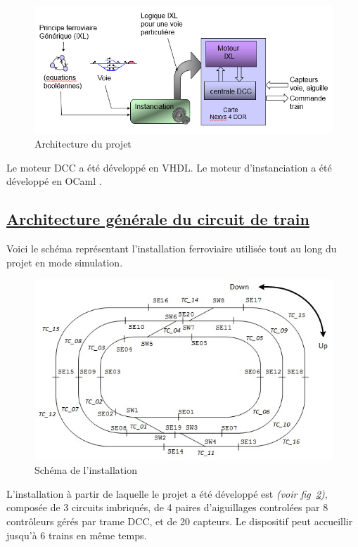 \begin{figure}[ht]
\centering
\includegraphics[scale=0.45]{moteur.png}
\caption{Architecture du projet}
\label{archi}
\end{figure}

Le moteur DCC a été développé en VHDL. Le moteur d'instanciation a été
développé en OCaml \cite{OCAML}.


\newpage
\subsection{\underline{Architecture g\'en\'erale du circuit de train}}
\label{sec:archi}

Voici le sch\'ema repr\'esentant l'installation ferroviaire utilis\'ee
tout au long du projet en mode simulation.

\begin{figure}[h]
\centering
\includegraphics[scale=0.55]{circuit_complet.jpg}
\caption{Sch\'ema de l'installation}
\label{fig4}
\end{figure}

L'installation à partir de laquelle le projet a été développé est
 \emph{(voir fig~\ref{fig4})}, compos\'ee de 3
circuits imbriqués, de 4 paires d'aiguillages control\'ees par 8
contr\^oleurs gérés par trame DCC, et de 20 capteurs.
Le dispositif peut accueillir jusqu'\`a 6 trains en m\^eme temps.

